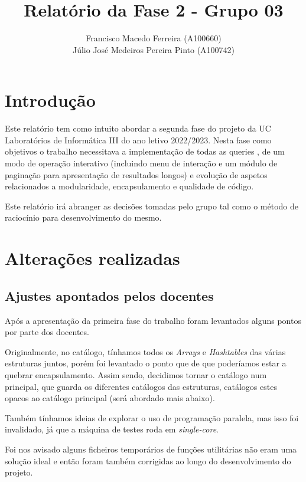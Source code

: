\documentclass{article}
\title{Relatório da Fase 2 - Grupo 03}
\author{Francisco Macedo Ferreira (A100660)\\Júlio José Medeiros Pereira Pinto (A100742)}
\begin{document}
  
    \maketitle
    
    \section{Introdução}
    Este relatório tem como intuito abordar a segunda fase do projeto da UC Laboratórios 
    de Informática III do ano letivo 2022/2023.
    Nesta fase como objetivos o trabalho necessitava a implementação de todas as queries
    , de um modo de operação interativo (incluindo menu de interação e um módulo de 
    paginação para apresentação de resultados longos) e evolução de aspetos relacionados
    a modularidade, encapsulamento e qualidade de código.
    
    Este relatório irá abranger as decisões tomadas pelo grupo tal como o método de 
    raciocínio para desenvolvimento do mesmo.
    
    \section{Alterações realizadas}
        \subsection{Ajustes apontados pelos docentes}
            Após a apresentação da primeira fase do trabalho foram levantados
            alguns pontos por parte dos docentes. 
            
            Originalmente, no catálogo, tínhamos todos os \textit{Arrays} e \textit{Hashtables} das 
            várias estruturas juntos, porém foi levantado o ponto que de que
            poderíamos estar a quebrar encapsulamento. Assim sendo, 
            decidimos tornar o catálogo num principal, que guarda os diferentes
            catálogos das estruturas, catálogos estes opacos ao catálogo principal
            (será abordado mais abaixo).
            
            Também tínhamos ideias de explorar o uso de programação paralela,
            mas isso foi invalidado, já que a máquina de testes roda em \textit{single-core}.

            Foi nos avisado alguns ficheiros temporários de funções
            utilitárias não eram uma solução ideal e então foram também
            corrigidas ao longo do desenvolvimento do projeto.
            
\end{document}
